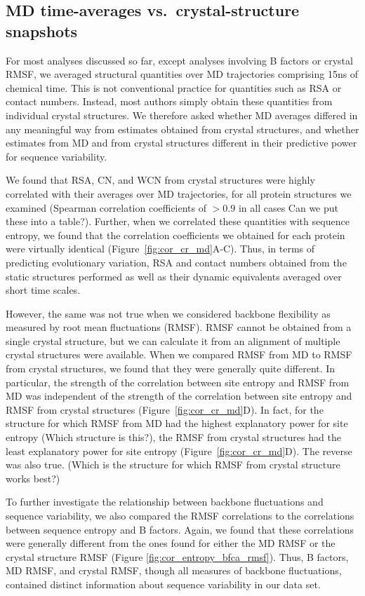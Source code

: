 \documentclass[12pt]{article}
\begin{document}
\subsection*{MD time-averages vs.\ crystal-structure snapshots}

For most analyses discussed so far, except analyses involving B factors or crystal RMSF, we averaged structural quantities over MD trajectories comprising 15ns of chemical time. This is not conventional practice for quantities such as RSA or contact numbers. Instead, most authors simply obtain these quantities from individual crystal structures. We therefore asked whether MD averages differed in any meaningful way from estimates obtained from crystal structures, and whether estimates from MD and from crystal structures different in their predictive power for sequence variability.

We found that RSA, CN, and WCN from crystal structures were highly correlated with their averages over MD trajectories, for all protein structures we examined (Spearman correlation coefficients of $>0.9$ in all cases {\color{red}Can we put these into a table?}). Further, when we correlated these quantities with sequence entropy, we found that the correlation coefficients we obtained for each protein were virtually identical (Figure~\ref{fig:cor_cr_md}A-C). Thus, in terms of predicting evolutionary variation, RSA and contact numbers obtained from the static structures performed as well as their dynamic equivalents averaged over short time scales.

However, the same was not true when we considered backbone flexibility as measured by root mean fluctuations (RMSF). RMSF cannot be obtained from a single crystal structure, but we can calculate it from an alignment of multiple crystal structures were available. When we compared RMSF from MD to RMSF from crystal structures, we found that they were generally quite different. In particular, the strength of the correlation between site entropy and RMSF from MD was independent of the strength of the correlation between site entropy and RMSF from crystal structures (Figure~\ref{fig:cor_cr_md}D). In fact, for the structure for which RMSF from MD had the highest explanatory power for site entropy {\color{red}(Which structure is this?)}, the RMSF from crystal structures had the least explanatory power for site entropy (Figure~\ref{fig:cor_cr_md}D). The reverse was also true. {\color{red}(Which is the structure for which RMSF from crystal structure works best?)}

To further investigate the relationship between backbone fluctuations and sequence variability, we also compared the RMSF correlations to the correlations between sequence entropy and B factors. Again, we found that these correlations were generally different from the ones found for either the MD RMSF or the crystal structure RMSF (Figure \ref{fig:cor_entropy_bfca_rmsf}). Thus, B factors, MD RMSF, and crystal RMSF, though all measures of backbone fluctuations, contained distinct information about sequence variability in our data set.
\end{document}
